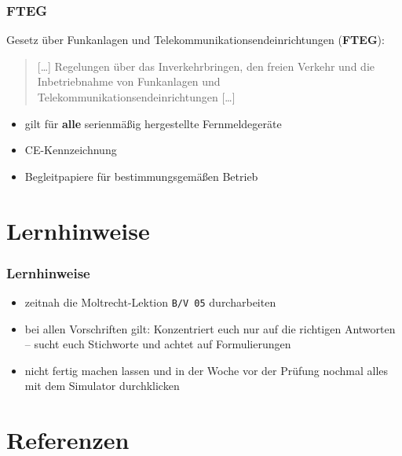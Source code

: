 \begin{frame}
  \frametitle{FTEG}

  Gesetz über Funkanlagen und Telekommunikationsendeinrichtungen
  (\textbf{FTEG}): \\[2em]

  \begin{quote}
    [\ldots] Regelungen über das Inverkehrbringen, den freien Verkehr
    und die Inbetriebnahme von Funkanlagen und
    Telekommunikationsendeinrichtungen [\ldots]
  \end{quote}

  \begin{itemize}
    \item gilt für \textbf{alle} serienmäßig hergestellte Fernmeldegeräte
    \item CE-Kennzeichnung
    \item Begleitpapiere für bestimmungsgemäßen Betrieb
  \end{itemize}

\end{frame}

\section{Lernhinweise}

\begin{frame}
  \frametitle{Lernhinweise}

  \begin{itemize}
    \item zeitnah die Moltrecht-Lektion \texttt{B/V 05} durcharbeiten
    \item bei allen Vorschriften gilt: Konzentriert euch nur auf die
      richtigen Antworten -- sucht euch Stichworte und achtet auf
      Formulierungen
    \item nicht fertig machen lassen und in der Woche vor der Prüfung
      nochmal alles mit dem Simulator durchklicken
  \end{itemize}

\end{frame}

\section{Referenzen}

